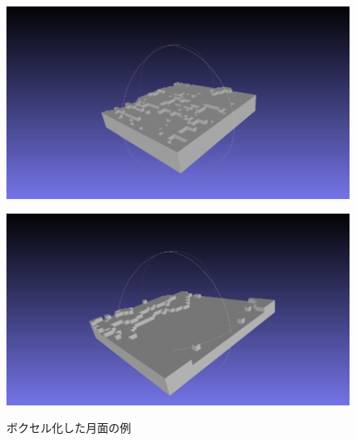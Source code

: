\documentclass[uplatex,twocolumn, dvipdfmx]{jsarticle}  %
\begin{document}
\begin{figure}[b]
  \centering
  \begin{minipage}[b]{0.49\linewidth}
    \centering
    \includegraphics[keepaspectratio, scale=0.25]{images/voxel1.png}
    \label{fig:voxel1}
  \end{minipage}
  \begin{minipage}[b]{0.49\linewidth}
    \centering
    \includegraphics[keepaspectratio, scale=0.25]{images/voxel2.png}
    \label{fig:voxel2}
  \end{minipage}
  \caption{ボクセル化した月面の例}\label{fig:voxel_moons}
\end{figure}
\end{document}
